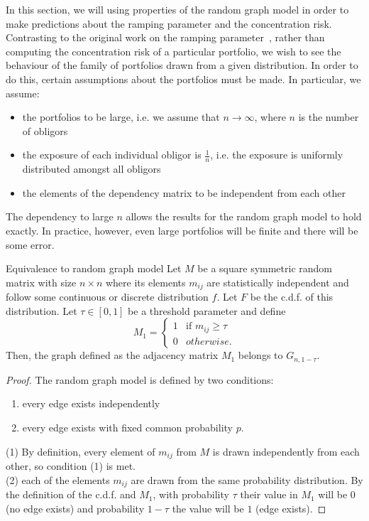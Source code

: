 In this section, we will using properties of the random graph model in order to make predictions about the ramping parameter and the concentration risk.
Contrasting to the original work on the ramping parameter~\cite{Sindel:2009vd}, rather than computing the concentration risk of a particular portfolio, we wish to see the behaviour of the family of portfolios drawn from a given distribution.
In order to do this, certain assumptions about the portfolios must be made.
In particular, we assume:
\begin{itemize}
	\item the portfolios to be large, i.e. we assume that $n \rightarrow \infty$, where $n$ is the number of obligors
	\item the exposure of each individual obligor is $\frac{1}{n}$, i.e. the exposure is uniformly distributed amongst all obligors
	\item the elements of the dependency matrix to be independent from each other
\end{itemize}

\begin{remark}The dependency to large $n$ allows the results for the random graph model to hold exactly.
In practice, however, even large portfolios will be finite and there will be some error.
\end{remark}

\begin{theorem}{Equivalence to random graph model}
\label{thm:equivalence}
Let $M$ be a square symmetric random matrix with size $n \times n$ where its elements $m_{ij}$ are statistically independent and follow some continuous or discrete distribution $f$.
Let $F$ be the c.d.f. of this distribution.
Let $\tau \in [0,1]$ be a threshold parameter and define $$M_1 = \begin{cases}
1 & \text{if  } m_{ij} \ge \tau\\
0 & otherwise.
\end{cases}$$
Then, the graph defined as the adjacency matrix $M_1$ belongs to $G_{n, 1-\tau}$.
\end{theorem}
\begin{proof} The random graph model is defined by two conditions:
\begin{enumerate}
	\item every edge exists independently
	\item every edge exists with fixed common probability $p$.
\end{enumerate}
(1) By definition, every element of $m_{ij}$ from $M$ is drawn independently from each other, so condition (1) is met.\\
(2) each of the elements $m_{ij}$ are drawn from the same probability distribution. By the definition of the c.d.f. and $M_1$, with probability $\tau$ their value in $M_1$ will be $0$ (no edge exists) and probability $1-\tau$ the value will be $1$ (edge exists).
\end{proof}
\vspace{0.5cm}

